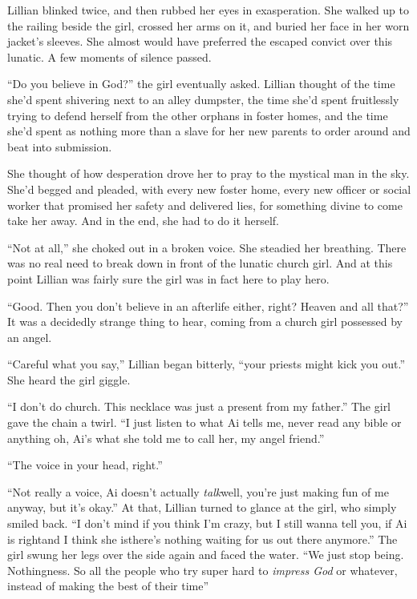 \begin{Standard}
Lillian blinked twice, and then rubbed her eyes in exasperation. She walked up to
the railing beside the girl, crossed her arms on it, and buried her face in her
worn jacket's sleeves. She almost would have preferred the escaped convict over this
lunatic. A few moments of silence passed.

``Do you believe in God?'' the girl eventually asked. Lillian thought of the time
she'd spent shivering next to an alley dumpster, the time she'd spent fruitlessly
trying to defend herself from the other orphans in foster homes, and the time she'd
spent as nothing more than a slave for her new parents to order around and beat
into submission.

She thought of how desperation drove her to pray to the mystical man in the sky.
She'd begged and pleaded, with every new foster home, every new officer or social
worker that promised her safety and delivered lies, for something divine to come
take her away. And in the end, she had to do it herself.

``Not at all,'' she choked out in a broken voice. She steadied her breathing.
There was no real need to break down in front of the lunatic church girl. And
at this point Lillian was fairly sure the girl was in fact here to play hero.

``Good. Then you don't believe in an afterlife either, right? Heaven and all that?''
It was a decidedly strange thing to hear, coming from a church girl possessed by
an angel.

``Careful what you say,'' Lillian began bitterly, ``your priests might kick you out.''
She heard the girl giggle.

``I don't do church. This necklace was just a present from my father.'' The girl gave
the chain a twirl. ``I just listen to what Ai tells me, never read any bible or anything
\textemdash{}oh, Ai's what she told me to call her, my angel friend.''

``The voice in your head, right.''

``Not really a voice, Ai doesn't actually \emph{talk}\textemdash{}well, you're just
making fun of me anyway, but it's okay.'' At that, Lillian turned to glance at the girl,
who simply smiled back. ``I don't mind if you think I'm crazy, but I still wanna tell you,
if Ai is right\textemdash{}and I think she is\textemdash{}there's nothing waiting for us
out there anymore.'' The girl swung her legs over the side again and faced the water. ``We just
stop being. Nothingness. So all the people who try super hard to \emph{impress God} or whatever,
instead of making the best of their time\textemdash{}''


\end{Standard}
